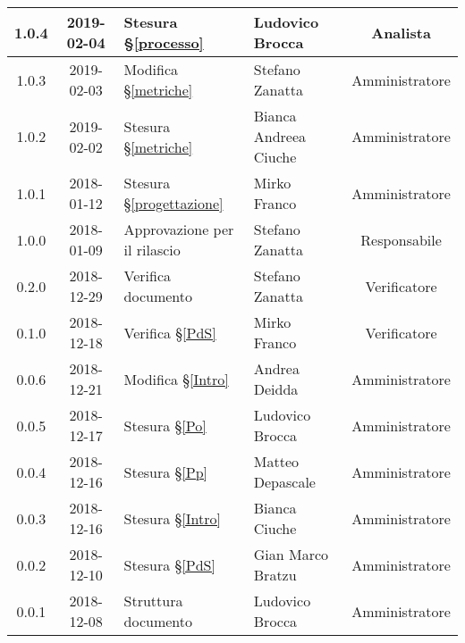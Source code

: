 \begin{center}
\begin{tabularx}{\textwidth}{|c|c|X|X|c|}
			\hline
			1.0.4 &2019-02-04&Stesura \S\ref{processo}&Ludovico Brocca& Analista\\
			\hline
			1.0.3 & 2019-02-03 & Modifica \S\ref{metriche} & Stefano Zanatta & Amministratore\\
			\hline
			1.0.2 & 2019-02-02 & Stesura \S\ref{metriche} & Bianca Andreea Ciuche & Amministratore\\
			\hline
			1.0.1 & 2018-01-12 & Stesura \S\ref{progettazione} & Mirko Franco & Amministratore \\
			\hline
			1.0.0 & 2018-01-09 & Approvazione per il rilascio & Stefano Zanatta & Responsabile\\
			\hline
			0.2.0 & 2018-12-29 & Verifica documento & Stefano Zanatta & Verificatore\\
			\hline
			0.1.0 & 2018-12-18 & Verifica \S\ref{PdS} & Mirko Franco & Verificatore\\
			\hline
			0.0.6 & 2018-12-21 & Modifica \S\ref{Intro} & Andrea Deidda & Amministratore\\
			\hline
			0.0.5 & 2018-12-17 & Stesura \S\ref{Po} & Ludovico Brocca & Amministratore\\
			\hline
			0.0.4 & 2018-12-16 & Stesura \S\ref{Pp} & Matteo Depascale & Amministratore\\
			\hline
			0.0.3 & 2018-12-16 & Stesura \S\ref{Intro} & Bianca Ciuche & Amministratore\\
			\hline
			0.0.2 & 2018-12-10 & Stesura \S\ref{PdS} & Gian Marco Bratzu & Amministratore\\	
			\hline
			0.0.1 & 2018-12-08 & Struttura documento  & Ludovico Brocca & Amministratore\\
			\hline
	\end{tabularx}
	\end{center}

\newpage